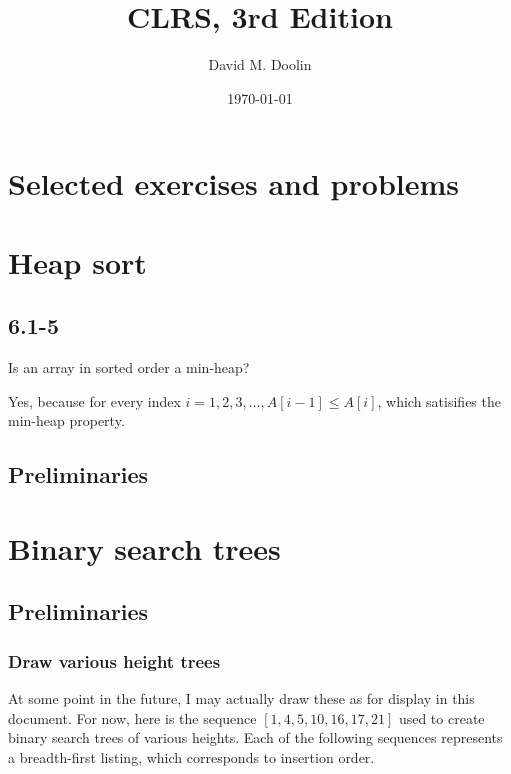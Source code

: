\documentclass{article}
\title{CLRS, 3rd Edition}
\date{\today}
\author{David M. Doolin}
\begin{document}
\maketitle


\tableofcontents


\section{Selected exercises and problems}


\setcounter{section}{6}
\section{Heap sort}

\subsection{6.1-5} Is an array in sorted order a min-heap?

Yes, because for every index $i = 1, 2, 3,\ldots, A[i-1] \leq A[i]$,
which satisifies the min-heap property.


\subsection{Preliminaries}


\setcounter{section}{11}
\section{Binary search trees}


\subsection{Preliminaries}


\subsubsection{Draw various height trees}

At some point in the future, I may actually draw these as for
display in this document. For now, here is the sequence
$[1, 4, 5, 10, 16, 17, 21]$ used to create binary search trees
of various heights. Each of the following sequences represents
a breadth-first listing, which corresponds to insertion order.
\end{document}
